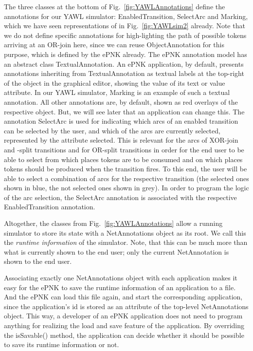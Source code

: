 \documentclass[a4paper]{llncs}
\begin{document}
The three classes at the bottom of Fig.~\ref{fig:YAWLAnnotations} define the annotations
for our YAWL simulator: {\sf EnabledTransition}, {\sf SelectArc} and {\sf Marking},
which we have seen representations of in Fig.~\ref{fig:YAWLsim2} already.
Note that we do not define specific annotations for high-lighting the path of
possible tokens arriving at an OR-join here, since we can reuse
{\sf ObjectAnnotation} for this purpose, which is defined by the ePNK already.
The ePNK annotation model has an abstract class {\sf TextualAnnotation}.
An ePNK application, by default, presents annotations inheriting from
{\sf TextualAnnotation} as textual labels at the top-right of the object
in the graphical editor, showing the value of its {\sf text} or {\sf value} attribute.
In our YAWL simulator, {\sf Marking} is an example of such a textual annotation. All other 
annotations are, by default, shown as red overlays of the respective
object. But, we will see later that an application can change this.
%
The annotation {\sf SelectArc} is used for indicating which arcs of an enabled
transition can be selected by the user, and which of the arcs are currently
selected, represented by the attribute {\sf selected}. This is relevant for the
arcs of XOR-join and -split transitions and for OR-split transitions in order for
the end user to be able to select from which places tokens are to be consumed and on which
places tokens should be produced when the transition fires. To this end, the user
will be able to select a combination of arcs for the respective transition
(the selected ones shown in blue, the not selected ones shown in grey).
In order to program the logic of the arc selection, the {\sf SelectArc} annotation
is associated with the respective {\sf EnabledTransition} annotation.

Altogether, the classes from Fig.~\ref{fig:YAWLAnnotations} allow a running
simulator to store its {\sf state} with a {\sf NetAnnotations} object as its root.
We call this
the \emph{runtime information} of the simulator. Note, that this can be much
more than what is currently shown to the end user; only the {\sf current}
{\sf NetAnnotation} is shown to the end user.

Associating exactly one {\sf NetAnnotations} object with each application
makes it easy for the ePNK to save the runtime information of an application
to a file. And the ePNK can load this file again, and start the corresponding
application, since the application's id is stored as an attribute of the top-level
{\sf NetAnnotations} object. This way, a developer of an ePNK application
does not need to program anything for realizing the load and save feature
of the application. By overriding the {\sf isSavable()} method, the application
can decide whether it should be possible to save its runtime information or not.
\end{document}
